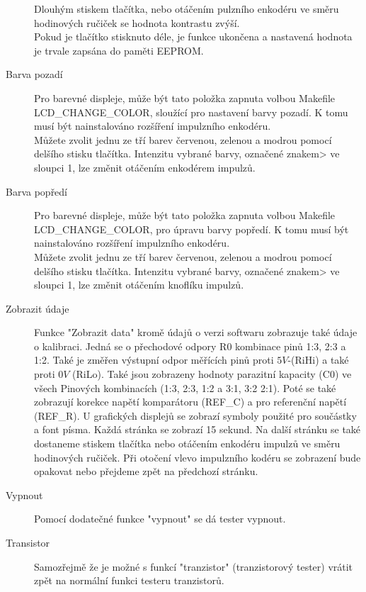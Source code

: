 \begin{description}
Dlouhým stiskem tlačítka, nebo otáčením pulzního enkodéru ve směru hodinových ručiček se hodnota kontrastu zvýší.\\
Pokud je tlačítko stisknuto déle, je funkce ukončena a nastavená hodnota je trvale zapsána do paměti EEPROM.
\vspace{-0.3cm}
\item[Barva pozadí]
Pro barevné displeje, může být tato položka zapnuta volbou Makefile\\ LCD\_CHANGE\_COLOR,
sloužící pro nastavení barvy pozadí. K tomu musí být nainstalováno rozšíření impulzního enkodéru.\\
Můžete zvolit jednu ze tří barev červenou, zelenou a modrou pomocí delšího stisku tlačítka.
Intenzitu vybrané barvy, označené znakem> ve sloupci 1,
lze změnit otáčením enkodérem impulzů.
\vspace{-0.3cm}
\item[Barva popředí]
Pro barevné displeje, může být tato položka zapnuta volbou Makefile\\ LCD\_CHANGE\_COLOR,
pro úpravu barvy popředí. K tomu musí být nainstalováno rozšíření impulzního enkodéru.\\
Můžete zvolit jednu ze tří barev červenou, zelenou a modrou pomocí delšího stisku tlačítka.
Intenzitu vybrané barvy, označené znakem> ve sloupci 1,
lze změnit otáčením knoflíku impulzů.
\vspace{-0.8cm}
\item[Zobrazit údaje]
Funkce "Zobrazit data" kromě údajů o verzi softwaru zobrazuje také údaje o kalibraci.
Jedná se o přechodové odpory R0  kombinace pinů 1:3, 2:3 a 1:2.
Také je změřen výstupní odpor měřících pinů proti \(5V\)-(RiHi) a také proti \(0V\) (RiLo).
Také jsou zobrazeny hodnoty parazitní kapacity (C0) ve všech Pinových kombinacích (1:3, 2:3, 1:2 a 3:1, 3:2 2:1).
Poté se také zobrazují korekce napětí komparátoru (REF\_C) a pro referenční napětí (REF\_R).
U grafických displejů se zobrazí symboly použité pro součástky a font písma.
Každá stránka se zobrazí 15 sekund.
Na další stránku se také dostaneme stiskem tlačítka nebo otáčením enkodéru impulzů ve směru hodinových ručiček.
Při otočení vlevo impulzního kodéru se zobrazení bude opakovat nebo přejdeme zpět na předchozí stránku.
\vspace{-0.3cm}
 \item[Vypnout]
Pomocí dodatečné funkce "vypnout" se dá tester vypnout.
\vspace{-0.3cm}
 \item[Transistor]
Samozřejmě že je možné s funkcí "tranzistor" (tranzistorový tester) vrátit zpět na normální funkci testeru tranzistorů.
\end{description}

